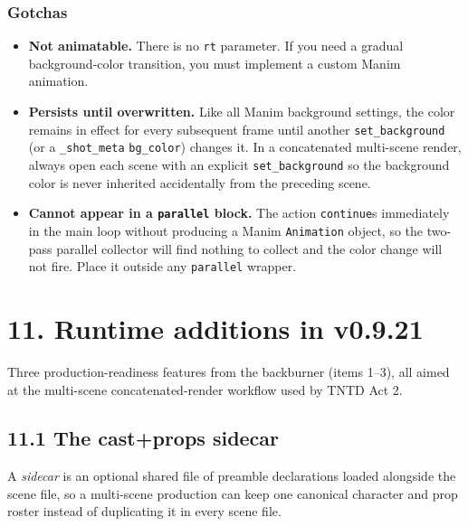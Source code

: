 \documentclass[
  12pt,
  letterpaper,
]{book}
\providecommand{\tightlist}{%
  \setlength{\itemsep}{0pt}\setlength{\parskip}{0pt}}
\begin{document}
\subsubsection{Gotchas}\label{set-background-gotchas}

\begin{itemize}
\tightlist
\item
  \textbf{Not animatable.} There is no \texttt{rt} parameter. If you
  need a gradual background-color transition, you must implement a
  custom Manim animation.
\item
  \textbf{Persists until overwritten.} Like all Manim background
  settings, the color remains in effect for every subsequent frame
  until another \texttt{set\_background} (or a \texttt{\_shot\_meta}
  \texttt{bg\_color}) changes it. In a concatenated multi-scene render,
  always open each scene with an explicit \texttt{set\_background} so
  the background color is never inherited accidentally from the
  preceding scene.
\item
  \textbf{Cannot appear in a \texttt{parallel} block.} The action
  \texttt{continue}s immediately in the main loop without producing a
  Manim \texttt{Animation} object, so the two-pass parallel collector
  will find nothing to collect and the color change will not fire.
  Place it outside any \texttt{parallel} wrapper.
\end{itemize}

\section{11. Runtime additions in
v0.9.21}\label{runtime-additions-in-v0.9.21}

Three production-readiness features from the backburner (items 1--3),
all aimed at the multi-scene concatenated-render workflow used by
TNTD Act 2.

\subsection{\texorpdfstring{11.1 The cast+props
sidecar}{11.1 The cast+props sidecar}}\label{the-cast-props-sidecar}

A \emph{sidecar} is an optional shared file of preamble declarations
loaded alongside the scene file, so a multi-scene production can keep
one canonical character and prop roster instead of duplicating it in
every scene file.
\end{document}
